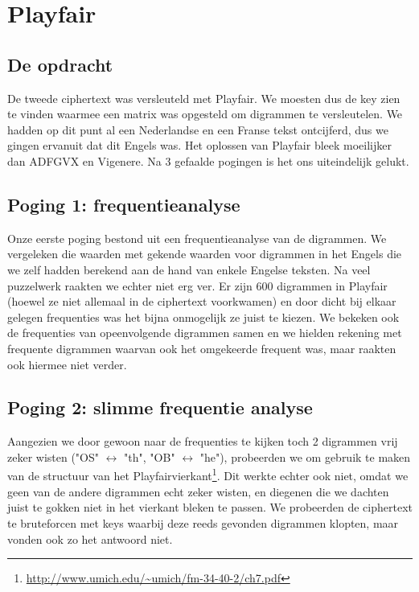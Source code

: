 
\section{Playfair}
\subsection{De opdracht}
De tweede ciphertext was versleuteld met Playfair. We moesten dus de key zien te vinden waarmee een matrix was opgesteld om digrammen te versleutelen. We hadden op dit punt al een Nederlandse en een Franse tekst ontcijferd, dus we gingen ervanuit dat dit Engels was. 
Het oplossen van Playfair bleek moeilijker dan ADFGVX en Vigenere. Na 3 gefaalde pogingen is het ons uiteindelijk gelukt.

\subsection{Poging 1: frequentieanalyse}
Onze eerste poging bestond uit een frequentieanalyse van de digrammen. We vergeleken die waarden met gekende waarden voor digrammen in het Engels die we zelf hadden berekend aan de hand van enkele Engelse teksten. Na veel puzzelwerk raakten we echter niet erg ver. Er zijn 600 digrammen in Playfair (hoewel ze niet allemaal in de ciphertext voorkwamen) en door dicht bij elkaar gelegen frequenties was het bijna onmogelijk ze juist te kiezen. We bekeken ook de frequenties van opeenvolgende digrammen samen en we hielden rekening met frequente digrammen waarvan ook het omgekeerde frequent was, maar raakten ook hiermee niet verder.

\subsection{Poging 2: slimme frequentie analyse}
Aangezien we door gewoon naar de frequenties te kijken toch 2 digrammen vrij zeker wisten ("OS" $\leftrightarrow$ "th", "OB" $\leftrightarrow$ "he"), probeerden we om gebruik te maken van de structuur van het Playfairvierkant\footnote{\url{http://www.umich.edu/~umich/fm-34-40-2/ch7.pdf}}. Dit werkte echter ook niet, omdat we geen van de andere digrammen echt zeker wisten, en diegenen die we dachten juist te gokken niet in het vierkant bleken te passen. We probeerden de ciphertext te bruteforcen met keys waarbij deze reeds gevonden digrammen klopten, maar vonden ook zo het antwoord niet.
 
